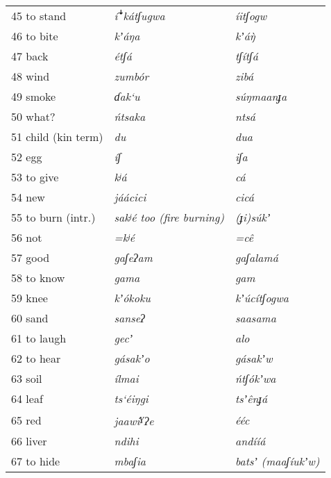 \documentclass[output=paper]{langsci/langscibook}
\begin{document}
\begin{longtable}{p{}  >{\itshape}p{} >{\itshape}p{}}
45 to stand & í\textsf{ꜜ}kátʃugwa & íitʃogw \\

46 to bite & kʼáŋa & kʼáŋ̀ \\

47 back & étʃá & tʃítʃá  \\ 

48 wind & zumb\'{o}r & zibá \\

49 smoke & ɗak‘u & s\'{u}ŋmaanɟa\\

50 what? & \'{n}tsaka & ntsá \\

51 child (kin term) & du & dua \\

52 egg & íʃ & iʃa \\

53 to give & kʲá & cá \\

54 new & jáácici & cicá \\

55 to burn (intr.) & sakʲé  too  \textup{(fire burning)} & (ɟi)s\'{u}kʼ \\

56 not & =kʲé & =c\^{e} \\

57 good & gaʃeʔam & gaʃalamá \\

58 to know & gama & gam \\

59 knee & kʼ\'{o}koku & kʼ\'{u}cítʃogwa \\

60 sand & sanseʔ & saasama \\

61 to laugh & gecʼ & alo \\

62 to hear & gásakʼo & gásakʼw \\

63 soil & ílmai & \'{n}tʃ\'{o}kʼwa \\

64 leaf & ts‘éiŋgi & tsʼ\^{e}nɟá \\

65 red & jaawi\textsuperscript{ɣ}ʔe & ééc \\

66 liver & ndihi & andííá \\

67 to hide & mbaʃia & batsʼ (maaʃíukʼw) \\


\end{longtable}
\end{document}

